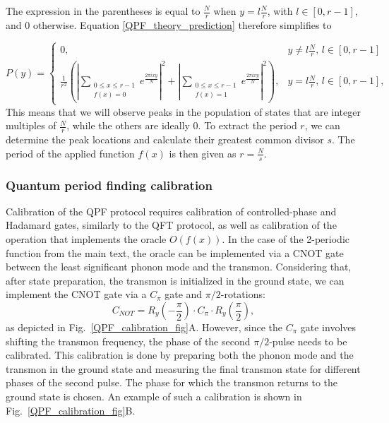 \documentclass[12pt]{article}
\begin{document}
The expression in the parentheses is equal to $\frac{N}{r}$ when $y = l\frac{N}{r}$, with $l \in [0,r-1]$, and 0 otherwise. Equation \ref{QPF_theory_prediction} therefore simplifies to








\begin{equation}
\label{QPF_theory_prediction_r}
P(y) =
\begin{cases}
0, & y \neq l\frac{N}{r}, \, l \in [0,r-1] \\
\frac{1}{r^2} \left( \left|\sum_{\substack{0 \le x \le r-1 \\ f(x) = 0}}e^{\frac{2\pi i xy}{N}}\right|^2 + \left|\sum_{\substack{0 \le x \le r-1 \\ f(x) = 1}}e^{\frac{2\pi i xy}{N}}\right|^2 \right), & y = l\frac{N}{r}, \, l \in [0,r-1],
\end{cases}
\end{equation}
This means that we will observe peaks in the population of states that are integer multiples of $\frac{N}{r}$, while the others are ideally 0. To extract the period $r$, we can determine the peak locations and calculate their greatest common divisor $s$. The period of the applied function $f(x)$ is then given as $r = \frac{N}{s}$.




\subsubsection{Quantum period finding calibration}

Calibration of the QPF protocol requires calibration of controlled-phase and Hadamard gates, similarly to the QFT protocol, as well as calibration of the operation that implements the oracle $O(f(x))$. In the case of the 2-periodic function from the main text, the oracle can be implemented via a CNOT gate between the least significant phonon mode and the transmon. Considering that, after state preparation, the transmon is initialized in the ground state, we can implement the CNOT gate via a $C_{\pi}$ gate and $\pi/2$-rotations:
\begin{equation}
C_{NOT} = R_y(-\frac{\pi}{2}) \cdot C_{\pi} \cdot R_y(\frac{\pi}{2}),
\end{equation}
as depicted in Fig.~\ref{QPF_calibration_fig}A. However, since the $C_{\pi}$ gate involves shifting the transmon frequency, the phase of the second $\pi/2$-pulse needs to be calibrated. This calibration is done by preparing both the phonon mode and the transmon in the ground state and measuring the final transmon state for different phases of the second pulse. The phase for which the transmon returns to the ground state is chosen. An example of such a calibration is shown in Fig.~\ref{QPF_calibration_fig}B.
\end{document}
